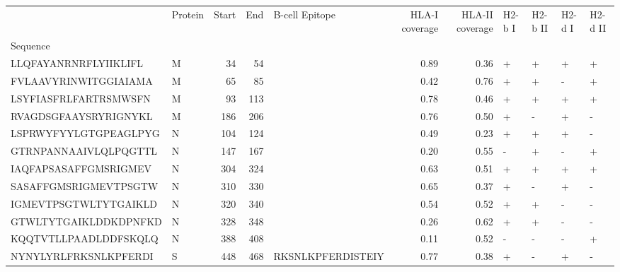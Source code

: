 \begin{tabular}{llrrlrrllll}
\toprule
{} & Protein &  Start &   End &     B-cell Epitope &  HLA-I coverage &  HLA-II coverage & H2-b I & H2-b II & H2-d I & H2-d II \\
Sequence              &         &        &       &                    &                 &                  &        &         &        &         \\
\midrule
LLQFAYANRNRFLYIIKLIFL &       M &     34 &    54 &                    &            0.89 &             0.36 &      + &       + &      + &       + \\
FVLAAVYRINWITGGIAIAMA &       M &     65 &    85 &                    &            0.42 &             0.76 &      + &       + &      - &       + \\
LSYFIASFRLFARTRSMWSFN &       M &     93 &   113 &                    &            0.78 &             0.46 &      + &       + &      + &       + \\
RVAGDSGFAAYSRYRIGNYKL &       M &    186 &   206 &                    &            0.76 &             0.50 &      + &       - &      + &       - \\
LSPRWYFYYLGTGPEAGLPYG &       N &    104 &   124 &                    &            0.49 &             0.23 &      + &       + &      + &       - \\
GTRNPANNAAIVLQLPQGTTL &       N &    147 &   167 &                    &            0.20 &             0.55 &      - &       + &      - &       + \\
IAQFAPSASAFFGMSRIGMEV &       N &    304 &   324 &                    &            0.63 &             0.51 &      + &       + &      + &       + \\
SASAFFGMSRIGMEVTPSGTW &       N &    310 &   330 &                    &            0.65 &             0.37 &      + &       - &      + &       - \\
IGMEVTPSGTWLTYTGAIKLD &       N &    320 &   340 &                    &            0.54 &             0.52 &      + &       + &      - &       - \\
GTWLTYTGAIKLDDKDPNFKD &       N &    328 &   348 &                    &            0.26 &             0.62 &      + &       + &      - &       - \\
KQQTVTLLPAADLDDFSKQLQ &       N &    388 &   408 &                    &            0.11 &             0.52 &      - &       - &      - &       + \\
NYNYLYRLFRKSNLKPFERDI &       S &    448 &   468 &  RKSNLKPFERDISTEIY &            0.77 &             0.38 &      + &       - &      + &       - \\

\end{tabular}
